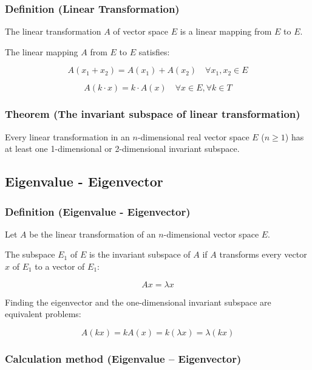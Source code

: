 \subsubsection{Definition (Linear Transformation)}

The linear transformation $A$ of vector space $E$ is a linear mapping from $E$ to $E$.

The linear mapping $A$ from $E$ to $E$ satisfies:

\[
A(x_1 + x_2) = A(x_1) + A(x_2) \quad \forall x_1, x_2 \in E
\]

\[
A(k \cdot x) = k \cdot A(x) \quad \forall x \in E, \forall k \in T
\]

\subsubsection{Theorem (The invariant subspace of linear transformation)}

Every linear transformation in an $n$-dimensional real vector space $E$ ($n \geq 1$) has at least one 1-dimensional or 2-dimensional invariant subspace.


\subsection{Eigenvalue - Eigenvector}

\subsubsection{Definition (Eigenvalue - Eigenvector)}

Let $A$ be the linear transformation of an $n$-dimensional vector space $E$.

The subspace $E_1$ of $E$ is the invariant subspace of $A$ if $A$ transforms every vector $x$ of $E_1$ to a vector of $E_1$:

\[
A x = \lambda x
\]

Finding the eigenvector and the one-dimensional invariant subspace are equivalent problems:

\[
A(k x) = k A(x) = k (\lambda x) = \lambda (k x)
\]

\subsubsection{Calculation method (Eigenvalue – Eigenvector)}


